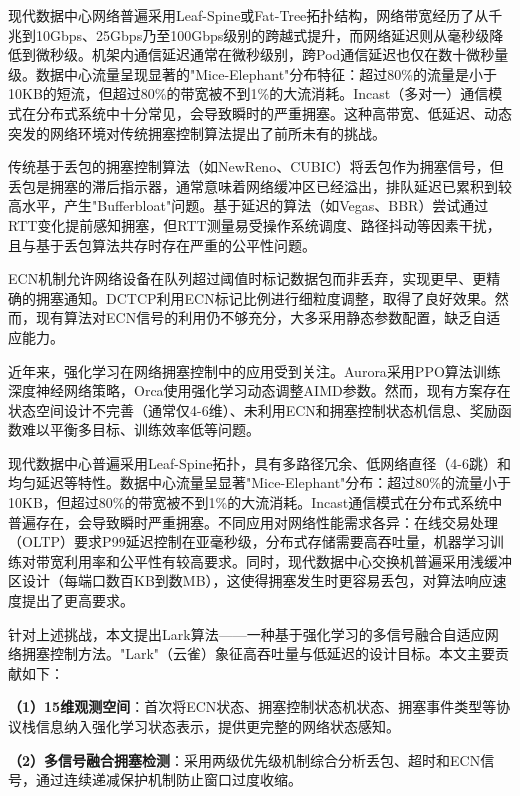 \documentclass[10pt,twocolumn]{article}
\begin{document}
现代数据中心网络普遍采用Leaf-Spine或Fat-Tree拓扑结构，网络带宽经历了从千兆到10Gbps、25Gbps乃至100Gbps级别的跨越式提升，而网络延迟则从毫秒级降低到微秒级\cite{datacentertraffic}。机架内通信延迟通常在微秒级别，跨Pod通信延迟也仅在数十微秒量级。数据中心流量呈现显著的"Mice-Elephant"分布特征：超过80\%的流量是小于10KB的短流，但超过80\%的带宽被不到1\%的大流消耗。Incast（多对一）通信模式在分布式系统中十分常见，会导致瞬时的严重拥塞。这种高带宽、低延迟、动态突发的网络环境对传统拥塞控制算法提出了前所未有的挑战。

传统基于丢包的拥塞控制算法（如NewReno\cite{newreno}、CUBIC\cite{cubic}）将丢包作为拥塞信号，但丢包是拥塞的滞后指示器，通常意味着网络缓冲区已经溢出，排队延迟已累积到较高水平，产生"Bufferbloat"问题\cite{bufferbloat}。基于延迟的算法（如Vegas\cite{vegas}、BBR\cite{bbr}）尝试通过RTT变化提前感知拥塞，但RTT测量易受操作系统调度、路径抖动等因素干扰，且与基于丢包算法共存时存在严重的公平性问题\cite{bbrfairness}。

ECN机制\cite{rfc3168}允许网络设备在队列超过阈值时标记数据包而非丢弃，实现更早、更精确的拥塞通知。DCTCP\cite{dctcp}利用ECN标记比例进行细粒度调整，取得了良好效果。然而，现有算法对ECN信号的利用仍不够充分，大多采用静态参数配置，缺乏自适应能力。

近年来，强化学习在网络拥塞控制中的应用受到关注\cite{rlcc}。Aurora\cite{aurora}采用PPO算法训练深度神经网络策略，Orca\cite{orca}使用强化学习动态调整AIMD参数。然而，现有方案存在状态空间设计不完善（通常仅4-6维）、未利用ECN和拥塞控制状态机信息、奖励函数难以平衡多目标、训练效率低等问题。

现代数据中心普遍采用Leaf-Spine拓扑，具有多路径冗余、低网络直径（4-6跳）和均匀延迟等特性。数据中心流量呈显著"Mice-Elephant"分布：超过80\%的流量小于10KB，但超过80\%的带宽被不到1\%的大流消耗。Incast通信模式在分布式系统中普遍存在，会导致瞬时严重拥塞。不同应用对网络性能需求各异：在线交易处理（OLTP）要求P99延迟控制在亚毫秒级，分布式存储需要高吞吐量，机器学习训练对带宽利用率和公平性有较高要求。同时，现代数据中心交换机普遍采用浅缓冲区设计（每端口数百KB到数MB），这使得拥塞发生时更容易丢包，对算法响应速度提出了更高要求。

针对上述挑战，本文提出Lark算法——一种基于强化学习的多信号融合自适应网络拥塞控制方法。"Lark"（云雀）象征高吞吐量与低延迟的设计目标。本文主要贡献如下：

\textbf{（1）15维观测空间}：首次将ECN状态、拥塞控制状态机状态、拥塞事件类型等协议栈信息纳入强化学习状态表示，提供更完整的网络状态感知。

\textbf{（2）多信号融合拥塞检测}：采用两级优先级机制综合分析丢包、超时和ECN信号，通过连续递减保护机制防止窗口过度收缩。
\end{document}
